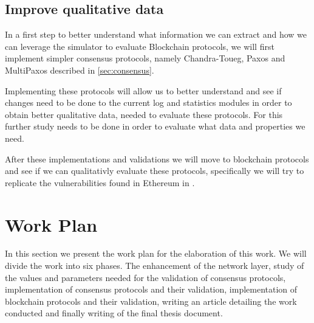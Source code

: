 \subsection{Improve qualitative data}
\label{subsec:improve_qualitative_data}

In a first step to better understand what information we can extract and how
we can leverage the simulator to evaluate Blockchain protocols, we will first implement
simpler consensus protocols, namely Chandra-Toueg, Paxos and MultiPaxos described in \ref{sec:consensus}.

Implementing these protocols will allow us to better understand and see if changes
need to be done to the current log and statistics modules in order to obtain better qualitative
data, needed to evaluate these protocols. For this further study needs to be done
in order to evaluate what data and properties we need.

After these implementations and validations we will move to blockchain protocols and see
if we can qualitativly evaluate these protocols, specifically we will try to
replicate the vulnerabilities found in Ethereum in \cite{ethereum_analysis}.

\section{Work Plan}
\label{sub:work_plan}

In this section we present the work plan for the elaboration of this work.
We will divide the work into six phases. The enhancement of the network layer,
study of the values and parameters needed for the validation of consensus protocols,
implementation of consensus protocols and their validation, implementation of blockchain
protocols and their validation, writing an article detailing the work conducted and
finally writing of the final thesis document.

